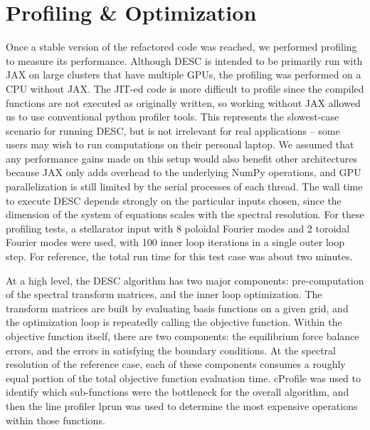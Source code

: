 \documentclass{article}
\begin{document}
\section{Profiling \& Optimization}
\label{sec:profiling}

Once a stable version of the refactored code was reached, we performed profiling to measure its performance.
Although DESC is intended to be primarily run with JAX on large clusters that have multiple GPUs, the profiling was performed on a CPU without JAX.
The JIT-ed code is more difficult to profile since the compiled functions are not executed as originally written, so working without JAX allowed us to use conventional python profiler tools.
This represents the slowest-case scenario for running DESC, but is not irrelevant for real applications -- some users may wish to run computations on their personal laptop.
We assumed that any performance gains made on this setup would also benefit other architectures because JAX only adds overhead to the underlying NumPy operations, and GPU parallelization is still limited by the serial processes of each thread.
The wall time to execute DESC depends strongly on the particular inputs chosen, since the dimension of the system of equations scales with the spectral resolution.
For these profiling tests, a stellarator input with 8 poloidal Fourier modes and 2 toroidal Fourier modes were used, with 100 inner loop iterations in a single outer loop step.
For reference, the total run time for this test case was about two minutes.

At a high level, the DESC algorithm has two major components: pre-computation of the spectral transform matrices, and the inner loop optimization.
The transform matrices are built by evaluating basis functions on a given grid, and the optimization loop is repeatedly calling the objective function.
Within the objective function itself, there are two components: the equilibrium force balance errors, and the errors in satisfying the boundary conditions.
At the spectral resolution of the reference case, each of these components consumes a roughly equal portion of the total objective function evaluation time.
cProfile was used to identify which sub-functions were the bottleneck for the overall algorithm, and then the line profiler lprun was used to determine the most expensive operations within those functions.
\end{document}
